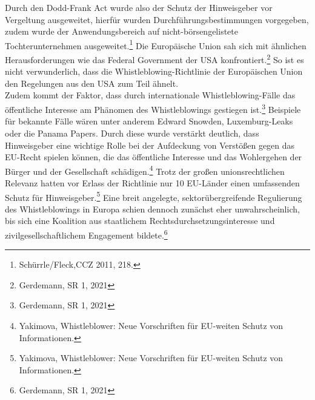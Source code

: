Durch den Dodd-Frank Act wurde also der Schutz der Hinweisgeber vor Vergeltung ausgeweitet, hierfür wurden Durchführungsbestimmungen vorgegeben, zudem wurde der Anwendungsbereich auf nicht-börsengelistete Tochterunternehmen ausgeweitet.\footnote{Schürrle/Fleck,CCZ 2011, 218.}
Die Europäische Union sah sich mit ähnlichen Herausforderungen wie das Federal Government der USA konfrontiert.\footnote{Gerdemann, SR 1, 2021}
So ist es nicht verwunderlich, dass die Whistleblowing-Richtlinie der Europäischen Union den Regelungen aus den USA zum Teil ähnelt.\\
Zudem kommt der Faktor, dass durch internationale Whistleblowing-Fälle das öffentliche Interesse am Phänomen des Whistleblowings gestiegen ist.\footnote{Gerdemann, SR 1, 2021} 
Beispiele für bekannte Fälle wären unter anderem Edward Snowden, Luxemburg-Leaks oder die Panama Papers.
Durch diese wurde verstärkt deutlich, dass Hinweisgeber eine wichtige Rolle bei der Aufdeckung von Verstößen gegen das EU-Recht spielen können, die das öffentliche Interesse und das Wohlergehen der Bürger und der Gesellschaft schädigen.\footnote{Yakimova, Whistleblower: Neue Vorschriften für EU-weiten Schutz von Informationen.}
Trotz der großen unionsrechtlichen Relevanz hatten vor Erlass der Richtlinie nur 10 EU-Länder einen umfassenden Schutz für Hinweisgeber.\footnote{Yakimova, Whistleblower: Neue Vorschriften für EU-weiten Schutz von Informationen.}
Eine breit angelegte, sektorübergreifende Regulierung des Whistleblowings in Europa schien dennoch zunächst eher unwahrscheinlich, bis sich eine Koalition aus staatlichem Rechtsdurchsetzungsinteresse und zivilgesellschaftlichem Engagement bildete.\footnote{Gerdemann, SR 1, 2021} 
